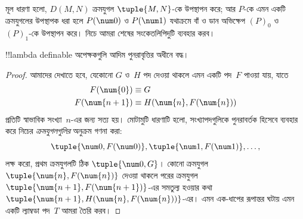 \documentclass[../../../include/open-logic-section]{subfiles}
\begin{document}
মূল ধারণা হলো, $D(M,N)$ ক্রমযুগল $\tuple{M, N}$-কে উপস্থাপন করে; আর
$P$-কে এমন একটি ক্রমযুগলের উপস্থাপক ধরা হলে $P(\num 0)$ ও $P(\num 1)$
যথাক্রমে বাঁ ও ডান অভিক্ষেপ $(P)_0$ ও~$(P)_1$-কে উপস্থাপন করে। নিচে আমরা
শেষের সংকেতলিপিদুটি ব্যবহার করব।

\begin{lem}
!!{lambda definable} অপেক্ষকগুলি আদিম পুনরাবৃত্তির অধীনে বদ্ধ।
\end{lem}

\begin{proof}
আমাদের দেখাতে হবে, যেকোনো $G$ ও~$H$ পদ দেওয়া থাকলে এমন একটি পদ~$F$
পাওয়া যায়, যাতে
\begin{align*}
F(\num{0}) & \equiv G \\
F(\num{n+1}) & \equiv H(\num{n}, F(\num{n}))
\end{align*}
প্রতিটি স্বাভাবিক সংখ্যা~$n$-এর জন্য সত্য হয়। মোটামুটি ধারণাটি হলো,
সংখ্যাপদগুলিকে পুনরাবর্তক হিসেবে ব্যবহার করে নিচের \emph{ক্রমযুগলগুলির}
অনুক্রম গণনা করা:
\[
\tuple{\num 0, F(\num 0)}, \tuple{\num 1, F(\num 1)}, \dots,
\]
লক্ষ করো, প্রথম ক্রমযুগলটি ঠিক $\tuple{\num 0, G}$। কোনো ক্রমযুগল
$\tuple{\num{n}, F(\num{n})}$ দেওয়া থাকলে পরের ক্রমযুগল
$\tuple{\num{n+1}, F(\num{n+1})}$-এর সমতুল্য হওয়ার কথা
$\tuple{\num{n+1}, H(\num{n}, F(\num{n}))}$-এর। এমন এক-ধাপের রূপান্তর
ঘটায় এমন একটি ল্যাম্বডা পদ~$T$ আমরা তৈরি করব।


\end{proof}
\end{document}
